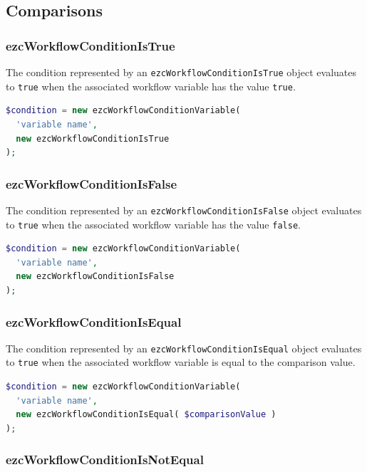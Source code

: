 \subsection{Comparisons}

\subsubsection{ezcWorkflowConditionIsTrue}

The condition represented by an \texttt{ezcWorkflowConditionIsTrue} object
evaluates to \texttt{true} when the associated workflow variable has the
value \texttt{true}.

\begin{lstlisting}[language=PHP]
$condition = new ezcWorkflowConditionVariable(
  'variable name',
  new ezcWorkflowConditionIsTrue
);
\end{lstlisting}

\subsubsection{ezcWorkflowConditionIsFalse}

The condition represented by an \texttt{ezcWorkflowConditionIsFalse} object
evaluates to \texttt{true} when the associated workflow variable has the
value \texttt{false}.

\begin{lstlisting}[language=PHP]
$condition = new ezcWorkflowConditionVariable(
  'variable name',
  new ezcWorkflowConditionIsFalse
);
\end{lstlisting}

\subsubsection{ezcWorkflowConditionIsEqual}

The condition represented by an \texttt{ezcWorkflowConditionIsEqual} object
evaluates to \texttt{true} when the associated workflow variable is equal to
the comparison value.

\begin{lstlisting}[language=PHP]
$condition = new ezcWorkflowConditionVariable(
  'variable name',
  new ezcWorkflowConditionIsEqual( $comparisonValue )
);
\end{lstlisting}

\subsubsection{ezcWorkflowConditionIsNotEqual}

